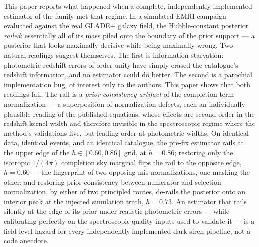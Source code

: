 This paper reports what happened when a complete, independently
implemented estimator of the \citet{Gray:2019ksv} family met that
regime.  In a simulated EMRI campaign evaluated against the real
GLADE+ galaxy field, the Hubble-constant posterior \emph{railed}:
essentially all of its mass piled onto the boundary of the prior
support --- a posterior that looks maximally decisive while being
maximally wrong.  Two natural readings suggest themselves.  The
first is information starvation: photometric redshift errors of
order unity have simply erased the catalogue's redshift information,
and no estimator could do better.  The second is a parochial
implementation bug, of interest only to the authors.  This paper
shows that both readings fail.  The rail is a \emph{prior-consistency
artifact} of the completion-term normalization --- a superposition of
normalization defects, each an individually plausible reading of the
published equations, whose effects are second order in the redshift
kernel width and therefore invisible in the spectroscopic regime
where the method's validations live, but leading order at photometric
widths.  On identical data, identical events, and an identical
catalogue, the pre-fix estimator rails at the upper edge of the
$h \in [0.60, 0.86]$ grid, at $h = 0.86$;
restoring only the isotropic $1/(4\pi)$ completion sky marginal
flips the rail to the opposite edge, $h = 0.60$ --- the fingerprint
of two opposing mis-normalizations, one masking the other;
and restoring prior consistency between numerator and selection
normalization, by either of two principled routes, de-rails the
posterior onto an interior peak at the injected simulation truth,
$h = 0.73$.
An estimator that rails silently at the edge of its prior under
realistic photometric errors --- while calibrating perfectly on the
spectroscopic-quality inputs used to validate it --- is a field-level
hazard for every independently implemented dark-siren pipeline, not a
code anecdote.

